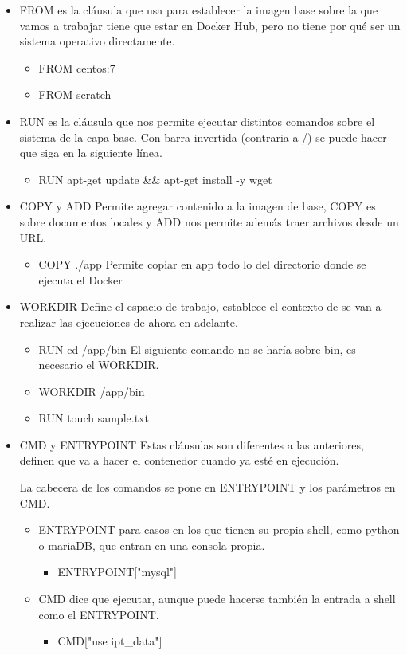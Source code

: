 \documentclass[12pt, twoside, openright]{report} %
\begin{document}
\begin{itemize}
	\item FROM es la cláusula que usa para establecer la imagen base sobre la que vamos a trabajar tiene que estar en Docker Hub, pero no tiene por qué ser un sistema operativo directamente.
	      \begin{itemize}
		      \item FROM centos:7
		      \item FROM scratch
	      \end{itemize}
	\item RUN es la cláusula que nos permite ejecutar distintos comandos sobre el sistema de la capa base. Con barra invertida (contraria a /) se puede hacer que siga en la siguiente línea.
	      \begin{itemize}
		      \item RUN apt-get update \&\& apt-get install -y wget
	      \end{itemize}
	\item COPY y ADD Permite agregar contenido a la imagen de base, COPY es sobre documentos locales y ADD nos permite además traer archivos desde un URL.
	      \begin{itemize}
		      \item COPY ./app Permite copiar en app todo lo del directorio donde se ejecuta el Docker
	      \end{itemize}
	\item WORKDIR Define el espacio de trabajo, establece el contexto de se van a realizar las ejecuciones de ahora en adelante.
	      \begin{itemize}
		      \item RUN cd /app/bin   El siguiente comando no se haría sobre bin, es necesario el WORKDIR.
		      \item WORKDIR /app/bin
		      \item RUN touch sample.txt
	      \end{itemize}
	\item CMD y ENTRYPOINT Estas cláusulas son diferentes a las anteriores, definen que va a hacer el contenedor cuando ya esté en ejecución.

	      La cabecera de los comandos se pone en ENTRYPOINT y los parámetros en CMD.
	      \begin{itemize}
		      \item ENTRYPOINT para casos en los que tienen su propia shell, como python o mariaDB, que entran en una consola propia.
		            \begin{itemize}
			            \item ENTRYPOINT["mysql"]
		            \end{itemize}
		      \item CMD dice que ejecutar, aunque puede hacerse también la entrada a shell como el ENTRYPOINT.
		            \begin{itemize}
			            \item CMD["use ipt\_data"]
		            \end{itemize}
	      \end{itemize}
\end{itemize}
\end{document}
